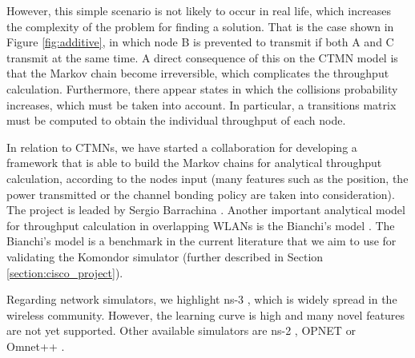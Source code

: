 \documentclass[12pt, a4paper,twoside]{tesi_upf}
\begin{document}
				However, this simple scenario is not likely to occur in real life, which increases the complexity of the problem for finding a solution. That is the case shown in Figure \ref{fig:additive}, in which node B is prevented to transmit if both A and C transmit at the same time. A direct consequence of this on the CTMN model is that the Markov chain become irreversible, which complicates the throughput calculation. Furthermore, there appear states in which the collisions probability increases, which must be taken into account. In particular, a transitions matrix must be computed to obtain the individual throughput of each node.
				
				In relation to CTMNs, we have started a collaboration for developing a framework that is able to build the Markov chains for analytical throughput calculation, according to the nodes input (many features such as the position, the power transmitted or the channel bonding policy are taken into consideration). The project is leaded by Sergio Barrachina \cite{barrachina2017ctmn}. Another important analytical model for throughput calculation in overlapping WLANs is the Bianchi's model \cite{bianchi2000performance}. The Bianchi's model is a benchmark in the current literature that we aim to use for validating the Komondor simulator (further described in Section \ref{section:cisco_project}).				
				
				Regarding network simulators, we highlight ns-3 \cite{carneiro2010ns}, which is widely spread in the wireless community. However, the learning curve is high and many novel features are not yet supported. 	Other available simulators are ns-2 \cite{issariyakul2011introduction}, OPNET \cite{modeler2009opnet} or Omnet++ \cite{varga2008overview}.
				
\end{document}
